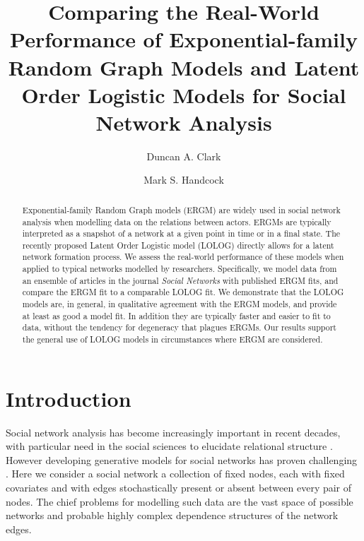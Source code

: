 \documentclass[
]{statsoc}
\title[ERGM and LOLOG Real-World Performance]{Comparing the Real-World Performance of Exponential-family Random Graph Models and Latent Order Logistic Models for Social Network Analysis}
\author[Duncan A. Clark]{Duncan A. Clark}
\author[Mark S. Handcock]{Mark S. Handcock}
\author{}
\date{\vspace{-2.5em}}
\begin{document}
\newcommand{\R}{\mathbb{R}}
\newcommand{\N}{\mathbb{N}}
\newcommand{\E}{\mathbb{E}}
\newcommand{\V}{\mathbb{V}}
\newcommand{\bfR}{\mathbf{R}}
\newcommand{\bfX}{\mathbf{X}}
\newcommand{\bfW}{\mathbf{W}}
\newcommand{\bfD}{\mathbf{D}}
\newcommand{\INT}{\int_{-\infty}^{+\infty}}
\newcommand{\p}{\partial}
\newcommand{\ra}{\Rightarrow}
\newcommand{\dH}{d\mathscr{H}}
\newcommand{\ch}{\text{cosh}}
\newcommand{\sh}{\text{sinh}}
\newcommand{\ex}{\mathbb{E}\left[X\right]}
\newcommand{\ey}{\mathbb{E}\left[Y\right]}
\newcommand{\logit}{{\rm logit}}
\newcommand{\MOM}{{\rm MOM}}

\setcounter{secnumdepth}{4}

\begin{abstract}
Exponential-family Random Graph models (ERGM) are widely used in social network analysis when modelling data on the relations between actors. ERGMs are typically interpreted as a snapshot of a network at a given point in time or in a final state. The recently proposed Latent Order Logistic model (LOLOG) directly allows for a latent network formation process. We assess the real-world performance of these models when applied to typical networks modelled by researchers. Specifically, 
we model data from an ensemble of articles in the journal \textit{Social Networks} with published ERGM fits, and compare the ERGM fit to a comparable LOLOG fit. We demonstrate that the LOLOG models are, in general, in qualitative agreement with the ERGM models, and provide at least as good a model fit. In addition they are typically faster and easier to fit to data, without the tendency for degeneracy that plagues ERGMs.
Our results support the general use of LOLOG models in circumstances where ERGM are considered.
\end{abstract}

\section{Introduction}

Social network analysis has become increasingly important in recent
decades, with particular need in the social sciences to elucidate
relational structure \citep{Goldenberg2010}. However developing
generative models for social networks has proven challenging
\citep{chatterjee2013}. Here we consider a social network a collection
of fixed nodes, each with fixed covariates and with edges stochastically
present or absent between every pair of nodes. The chief problems for
modelling such data are the vast space of possible networks and probable
highly complex dependence structures of the network edges.
\end{document}
